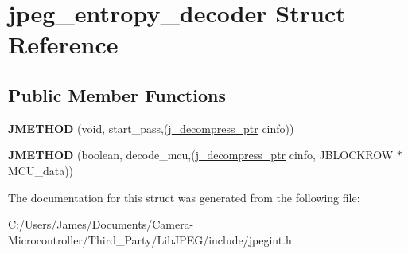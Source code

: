 \hypertarget{structjpeg__entropy__decoder}{}\section{jpeg\+\_\+entropy\+\_\+decoder Struct Reference}
\label{structjpeg__entropy__decoder}
\subsection*{Public Member Functions}
\begin{DoxyCompactItemize}
\item 
\mbox{\label{structjpeg__entropy__decoder_a49e08839ba93659b8c4dae80ec9f4252}} 
{\bfseries J\+M\+E\+T\+H\+OD} (void, start\+\_\+pass,(\hyperlink{structjpeg__decompress__struct}{j\+\_\+decompress\+\_\+ptr} cinfo))
\item 
\mbox{\label{structjpeg__entropy__decoder_ad2ba73b53dc170cc26fc3022e15a1b8f}} 
{\bfseries J\+M\+E\+T\+H\+OD} (boolean, decode\+\_\+mcu,(\hyperlink{structjpeg__decompress__struct}{j\+\_\+decompress\+\_\+ptr} cinfo, J\+B\+L\+O\+C\+K\+R\+OW $\ast$M\+C\+U\+\_\+data))
\end{DoxyCompactItemize}


The documentation for this struct was generated from the following file\+:\begin{DoxyCompactItemize}
\item 
C\+:/\+Users/\+James/\+Documents/\+Camera-\/\+Microcontroller/\+Third\+\_\+\+Party/\+Lib\+J\+P\+E\+G/include/jpegint.\+h\end{DoxyCompactItemize}
